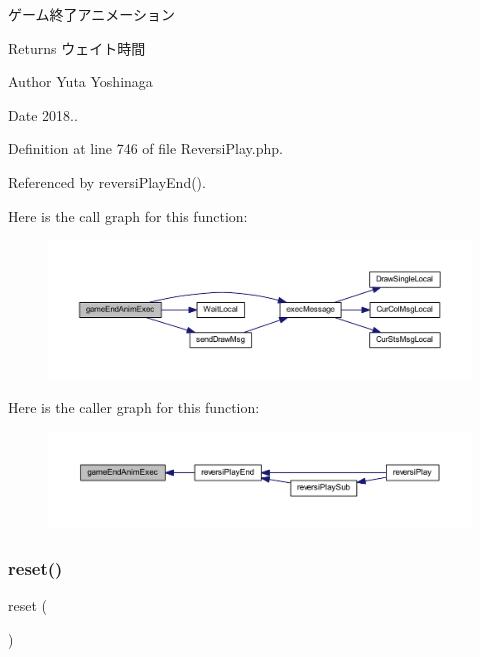 ゲーム終了アニメーション 

\begin{DoxyReturn}{Returns}
ウェイト時間 
\end{DoxyReturn}
\begin{DoxyAuthor}{Author}
Yuta Yoshinaga 
\end{DoxyAuthor}
\begin{DoxyDate}{Date}
2018.. 
\end{DoxyDate}


Definition at line 746 of file Reversi\+Play.\+php.



Referenced by reversi\+Play\+End().

Here is the call graph for this function\+:
\nopagebreak
\begin{figure}[H]
\begin{center}
\leavevmode
\includegraphics[width=350pt]{class_reversi_play_acbcd366da8242203ae52fb685fbc929e_cgraph}
\end{center}
\end{figure}
Here is the caller graph for this function\+:
\nopagebreak
\begin{figure}[H]
\begin{center}
\leavevmode
\includegraphics[width=350pt]{class_reversi_play_acbcd366da8242203ae52fb685fbc929e_icgraph}
\end{center}
\end{figure}
\mbox{\label{class_reversi_play_a4a20559544fdf4dcb457e258dc976cf8}} 
\subsubsection{\texorpdfstring{reset()}{reset()}}
{\footnotesize\ttfamily reset (\begin{DoxyParamCaption}{ }\end{DoxyParamCaption})}



